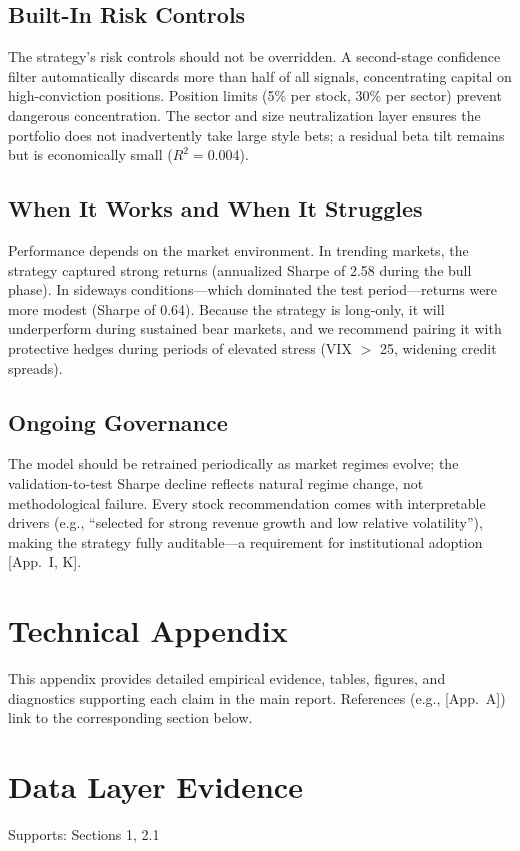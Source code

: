 \documentclass[11pt, a4paper]{article}
\begin{document}
\subsection{Built-In Risk Controls}
The strategy's risk controls should not be overridden. A second-stage confidence filter automatically discards more than half of all signals, concentrating capital on high-conviction positions. Position limits (5\% per stock, 30\% per sector) prevent dangerous concentration. The sector and size neutralization layer ensures the portfolio does not inadvertently take large style bets; a residual beta tilt remains but is economically small ($R^2 = 0.004$).

\subsection{When It Works and When It Struggles}
Performance depends on the market environment. In trending markets, the strategy captured strong returns (annualized Sharpe of 2.58 during the bull phase). In sideways conditions---which dominated the test period---returns were more modest (Sharpe of 0.64). Because the strategy is long-only, it will underperform during sustained bear markets, and we recommend pairing it with protective hedges during periods of elevated stress (VIX $>$ 25, widening credit spreads).

\subsection{Ongoing Governance}
The model should be retrained periodically as market regimes evolve; the validation-to-test Sharpe decline reflects natural regime change, not methodological failure. Every stock recommendation comes with interpretable drivers (e.g., ``selected for strong revenue growth and low relative volatility''), making the strategy fully auditable---a requirement for institutional adoption [App.\ I, K].

\clearpage
\appendix
\section*{Technical Appendix}
This appendix provides detailed empirical evidence, tables, figures, and diagnostics supporting each claim in the main report. References (e.g., [App.\ A]) link to the corresponding section below.

\section{Data Layer Evidence}
Supports: Sections 1, 2.1
\end{document}
